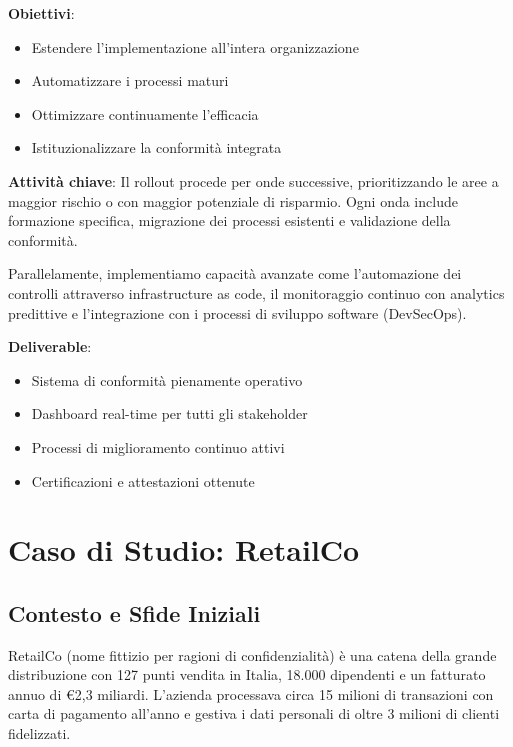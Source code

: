 \textbf{Obiettivi}:
\begin{itemize}
    \item Estendere l'implementazione all'intera organizzazione
    \item Automatizzare i processi maturi
    \item Ottimizzare continuamente l'efficacia
    \item Istituzionalizzare la conformità integrata
\end{itemize}

\textbf{Attività chiave}:
Il rollout procede per onde successive, prioritizzando le aree a maggior rischio o con maggior potenziale di risparmio. Ogni onda include formazione specifica, migrazione dei processi esistenti e validazione della conformità.

Parallelamente, implementiamo capacità avanzate come l'automazione dei controlli attraverso infrastructure as code, il monitoraggio continuo con analytics predittive e l'integrazione con i processi di sviluppo software (DevSecOps).

\textbf{Deliverable}:
\begin{itemize}
    \item Sistema di conformità pienamente operativo
    \item Dashboard real-time per tutti gli stakeholder
    \item Processi di miglioramento continuo attivi
    \item Certificazioni e attestazioni ottenute
\end{itemize}

\section{\texorpdfstring{Caso di Studio: RetailCo}{4.7 - Caso di Studio: RetailCo}}
\label{sec:4.7_caso_studio}

\subsection{\texorpdfstring{Contesto e Sfide Iniziali}{4.7.1 - Contesto e Sfide Iniziali}}
\label{subsec:4.7.1_contesto}

RetailCo (nome fittizio per ragioni di confidenzialità) è una catena della grande distribuzione con 127 punti vendita in Italia, 18.000 dipendenti e un fatturato annuo di €2,3 miliardi. L'azienda processava circa 15 milioni di transazioni con carta di pagamento all'anno e gestiva i dati personali di oltre 3 milioni di clienti fidelizzati.


